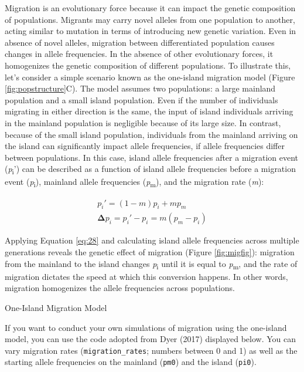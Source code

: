 \documentclass[
]{book}
\begin{document}
Migration is an evolutionary force because it can impact the genetic composition of populations. Migrants may carry novel alleles from one population to another, acting similar to mutation in terms of introducing new genetic variation. Even in absence of novel alleles, migration between differentiated population causes changes in allele frequencies. In the absence of other evolutionary forces, it homogenizes the genetic composition of different populations. To illustrate this, let's consider a simple scenario known as the one-island migration model (Figure \ref{fig:popstructure}C). The model assumes two populations: a large mainland population and a small island population. Even if the number of individuals migrating in either direction is the same, the input of island individuals arriving in the mainland population is negligible because of its large size. In contrast, because of the small island population, individuals from the mainland arriving on the island can significantly impact allele frequencies, if allele frequencies differ between populations. In this case, island allele frequencies after a migration event (\emph{p}\textsubscript{i}') can be described as a function of island allele frequencies before a migration event (\emph{p}\textsubscript{i}), mainland allele frequencies (\emph{p}\textsubscript{m}), and the migration rate (\emph{m}):

\begin{align} 
p_i' = (1-m)p_i+mp_m \label{eq:28} \\
𝚫p_i=p_i'-p_i=m(p_m-p_i) \label{eq:29}
\end{align}

Applying Equation \eqref{eq:28} and calculating island allele frequencies across multiple generations reveals the genetic effect of migration (Figure \ref{fig:migfig}): migration from the mainland to the island changes \emph{p}\textsubscript{i} until it is equal to \emph{p}\textsubscript{m}, and the rate of migration dictates the speed at which this conversion happens. In other words, migration homogenizes the allele frequencies across populations.

One-Island Migration Model

If you want to conduct your own simulations of migration using the one-island model, you can use the code adopted from Dyer (2017) displayed below. You can vary migration rates (\texttt{migration\_rates}; numbers between 0 and 1) as well as the starting allele frequencies on the mainland (\texttt{pm0}) and the island (\texttt{pi0}).
\end{document}
